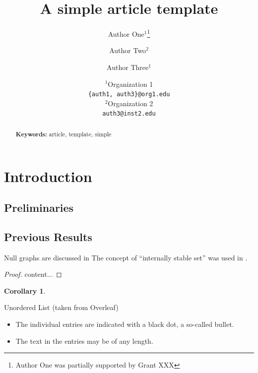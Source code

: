 \documentclass[a4paper]{article}
\title{A simple article template}
\author{Author One$^1$\thanks{Author One was partially supported by Grant XXX} \and Author Two$^2$ \and Author Three$^1$}
\date{
	$^1$Organization 1 \\ \texttt{\{auth1, auth3\}@org1.edu}\\%
	$^2$Organization 2 \\ \texttt{auth3@inst2.edu}\\[2ex]%
}
\theoremstyle{plain}
\newtheorem{corollary}[theorem]{Corollary}
\theoremstyle{definition}
\newif\ifsubmission
\begin{document}
	\linenumbers
	\maketitle
	
	\begin{abstract}
		\lipsum[1]
		
		\noindent\textbf{Keywords:} article, template, simple
	\end{abstract}

	\ifsubmission
	\else
	\listoftodos
	\fi

	\tableofcontents

	\vfill
	\doclicenseThis
	\clearpage
	
	\section{Introduction}
	\label{sec:intro}
	
	\lipsum[2]
	
	\subsection{Preliminaries}
	\label{sec:pre}
	
	\lipsum[3]
	
	\subsection{Previous Results}
	\label{sec:prev-results}
	
	Null graphs are discussed in \cite{HararyR74}
	The concept of ``internally stable set'' was used in \cite{Berge57, Berge58}.
	
	\begin{theoremrep}
		\label{thrm:1}
		\lipsum[4]
	\end{theoremrep}
	\begin{proof}
		content...
	\end{proof}

	\begin{corollary}
	\label{cor:1}
	
	\lipsum[5]
	\end{corollary}

	Unordered List (taken from Overleaf)
	\begin{itemize}
		\item The individual entries are indicated with a black dot, a so-called bullet.
		\item The text in the entries may be of any length.
	\end{itemize}
\end{document}
